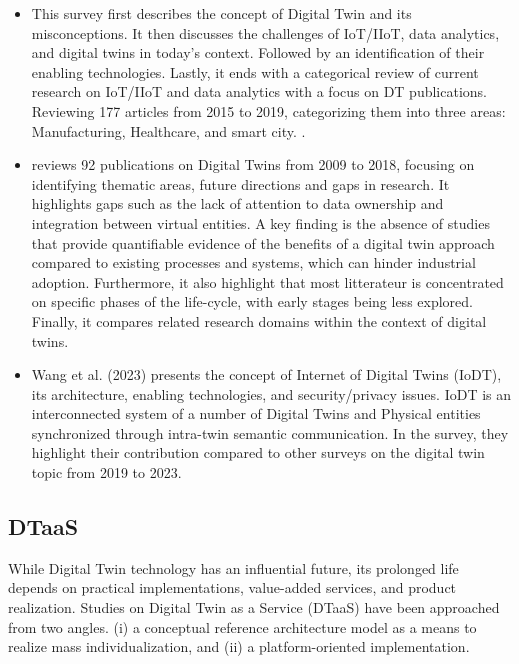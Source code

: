 \begin{itemize}
    \item This survey first describes the concept of Digital Twin and its misconceptions. It then discusses the challenges of IoT/IIoT, data analytics, and digital twins in today's context. Followed by an identification of their enabling technologies. Lastly, it ends with a categorical review of current research on IoT/IIoT and data analytics with a focus on DT publications. Reviewing 177 articles from 2015 to 2019, categorizing them into three areas: Manufacturing, Healthcare, and smart city. \cite{Fuller9103025}.
    \item \cite{JONES202036} reviews 92 publications on Digital Twins from 2009 to 2018, focusing on identifying thematic areas, future directions and gaps in research. It highlights gaps such as the lack of attention to data ownership and integration between virtual entities. A key finding is the absence of studies that provide quantifiable evidence of the benefits of a digital twin approach compared to existing processes and systems, which can hinder industrial adoption. Furthermore, it also highlight that most litterateur is concentrated on specific phases of the life-cycle, with early stages being less explored. Finally, it compares related research domains within the context of digital twins.
    \item Wang et al. (2023) \cite{Wang10090432} presents the concept of Internet of Digital Twins (IoDT), its architecture, enabling technologies, and security/privacy issues. IoDT is an interconnected system of a number of Digital Twins and Physical entities synchronized through intra-twin semantic communication. In the survey, they highlight their contribution compared to other surveys on the digital twin topic from 2019 to 2023. 
\end{itemize}

\subsection{DTaaS}
While Digital Twin technology has an influential future, its prolonged life depends on practical implementations, value-added services, and product realization. Studies on Digital Twin as a Service (DTaaS) have been approached from two angles. (i) a conceptual reference architecture model as a means to realize mass individualization, and (ii) a platform-oriented implementation.

